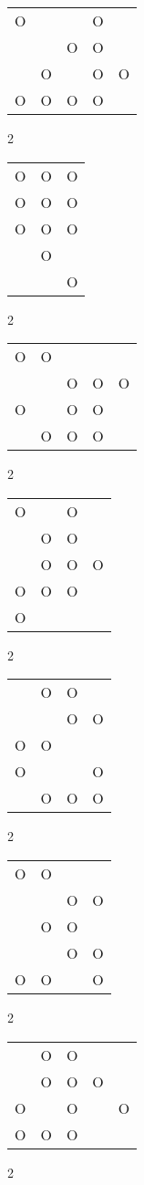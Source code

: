 \begin{tabular}{|m{0.2cm}m{0.2cm}m{0.2cm}m{0.2cm}m{0.2cm}|}\hline
O& & &O& \\
 & &O&O& \\
 &O& &O&O\\
O&O&O&O& \\
\hline\end{tabular}2
\begin{tabular}{|m{0.2cm}m{0.2cm}m{0.2cm}|}\hline
O&O&O\\
O&O&O\\
O&O&O\\
 &O& \\
 & &O\\
\hline\end{tabular}2
\begin{tabular}{|m{0.2cm}m{0.2cm}m{0.2cm}m{0.2cm}m{0.2cm}|}\hline
O&O& & & \\
 & &O&O&O\\
O& &O&O& \\
 &O&O&O& \\
\hline\end{tabular}2
\begin{tabular}{|m{0.2cm}m{0.2cm}m{0.2cm}m{0.2cm}|}\hline
O& &O& \\
 &O&O& \\
 &O&O&O\\
O&O&O& \\
O& & & \\
\hline\end{tabular}2
\begin{tabular}{|m{0.2cm}m{0.2cm}m{0.2cm}m{0.2cm}|}\hline
 &O&O& \\
 & &O&O\\
O&O& & \\
O& & &O\\
 &O&O&O\\
\hline\end{tabular}2
\begin{tabular}{|m{0.2cm}m{0.2cm}m{0.2cm}m{0.2cm}|}\hline
O&O& & \\
 & &O&O\\
 &O&O& \\
 & &O&O\\
O&O& &O\\
\hline\end{tabular}2
\begin{tabular}{|m{0.2cm}m{0.2cm}m{0.2cm}m{0.2cm}m{0.2cm}|}\hline
 &O&O& & \\
 &O&O&O& \\
O& &O& &O\\
O&O&O& & \\
\hline\end{tabular}2
